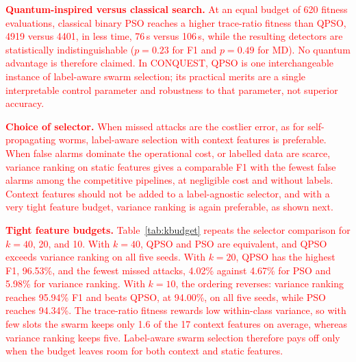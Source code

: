 \documentclass[conference]{IEEEtran}
\begin{document}
\textcolor{red}{\textbf{Quantum-inspired versus classical
search.} At an equal budget of 620 fitness evaluations, classical
binary PSO reaches a higher trace-ratio fitness than QPSO, 4919
versus 4401, in less time, 76\,s versus 106\,s, while the resulting
detectors are statistically indistinguishable ($p=0.23$ for F1 and
$p=0.49$ for MD). No quantum advantage is therefore claimed. In
CONQUEST, QPSO is one interchangeable instance of label-aware swarm
selection; its practical merits are a single interpretable control
parameter and robustness to that parameter, not superior accuracy.}

\textcolor{red}{\textbf{Choice of selector.} When
missed attacks are the costlier error, as for self-propagating worms,
label-aware selection with context features is preferable. When false
alarms dominate the operational cost, or labelled data are scarce,
variance ranking on static features gives a comparable F1 with the
fewest false alarms among the competitive pipelines, at negligible
cost and without labels. Context features should not be added to a
label-agnostic selector, and with a very tight feature budget,
variance ranking is again preferable, as shown next.}

\textcolor{red}{\textbf{Tight feature budgets.}
Table~\ref{tab:kbudget} repeats the selector comparison for $k=40$, 20,
and 10. With $k=40$, QPSO and PSO are equivalent, and QPSO exceeds
variance ranking on all five seeds. With $k=20$, QPSO has the highest
F1, 96.53\%, and the fewest missed attacks, 4.02\% against 4.67\% for
PSO and 5.98\% for variance ranking. With $k=10$, the ordering
reverses: variance ranking reaches 95.94\% F1 and beats QPSO, at
94.00\%, on all five seeds, while PSO reaches 94.34\%. The trace-ratio
fitness rewards low within-class variance, so with few slots the
swarm keeps only 1.6 of the 17 context features on average, whereas
variance ranking keeps five. Label-aware swarm selection therefore
pays off only when the budget leaves room for both context and static
features.}
\end{document}
